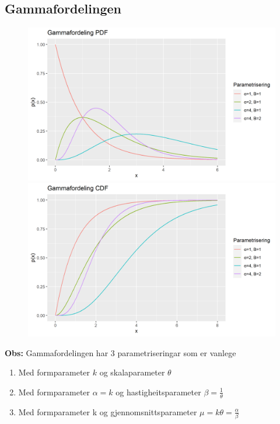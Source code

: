 \subsection{Gammafordelingen}
\begin{figure}[H]
  \centering
  \begin{minipage}[b]{0.49\textwidth}
\includegraphics[width=\textwidth]{bilete/gammapdf.png}
  \end{minipage}
  \hfill
  \begin{minipage}[b]{0.49\textwidth}
    \includegraphics[width=\textwidth]{bilete/gammacdf.png}
  \end{minipage}
\end{figure}

\textbf{Obs: } Gammafordelingen har 3 parametriseringar som er vanlege

\begin{enumerate}
    \item Med formparameter $k$ og skalaparameter $\theta$ \label{pointgamma}
    \item Med formparameter $\alpha = k$ og hastigheitsparameter $\beta = \frac{1}{\theta}$ \label{pointgamma2}
    \item Med formparameter k og gjennomsnittsparameter $\mu = k\theta = \frac{\alpha}{\beta}$
\end{enumerate}


